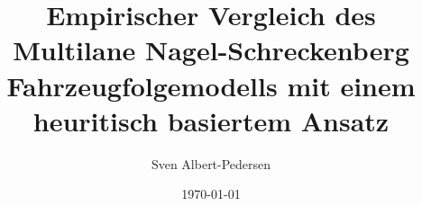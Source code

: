 \documentclass{tucplain}
\title{\textbf{Empirischer Vergleich des Multilane Nagel-Schreckenberg Fahrzeugfolgemodells mit einem heuritisch basiertem Ansatz}}
\author{Sven Albert-Pedersen}
\date{\today}
\begin{document}
    \let\ref\cref
    
    
    \listoftodos
    
    
    
     
    
    
    
    
\end{document}
